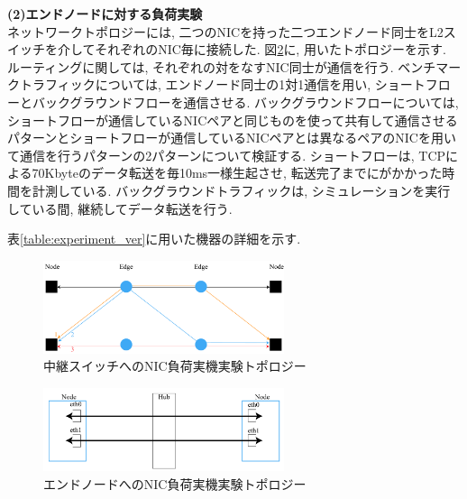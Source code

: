 {\bf (2)エンドノードに対する負荷実験}\\
ネットワークトポロジーには, 二つのNICを持った二つエンドノード同士をL2スイッチを介してそれぞれのNIC毎に接続した.
図\ref{fig:topology_node}に, 用いたトポロジーを示す.
ルーティングに関しては, それぞれの対をなすNIC同士が通信を行う.
ベンチマークトラフィックについては, エンドノード同士の1対1通信を用い, ショートフローとバックグラウンドフローを通信させる.
バックグラウンドフローについては,
ショートフローが通信しているNICペアと同じものを使って共有して通信させるパターンとショートフローが通信しているNICペアとは異なるペアのNICを用いて通信を行うパターンの2パターンについて検証する.
ショートフローは, TCPによる70Kbyteのデータ転送を毎10ms一様生起させ, 転送完了までにがかかった時間を計測している.
バックグラウンドトラフィックは, シミュレーションを実行している間, 継続してデータ転送を行う.

表\ref{table:experiment_ver}に用いた機器の詳細を示す.
\begin{figure}[t]
    \begin{center}
    \includegraphics[autoebb, width=200pt]{./img/topology_ns3.pdf}
    \caption{中継スイッチへのNIC負荷実機実験トポロジー}
    \label{fig:topology_switch}
    \end{center}
\end{figure}

\begin{figure}[t]
    \begin{center}
    \includegraphics[autoebb, width=200pt]{./img/topology_real.pdf}
    \caption{エンドノードへのNIC負荷実機実験トポロジー}
    \label{fig:topology_node}
    \end{center}
\end{figure}

